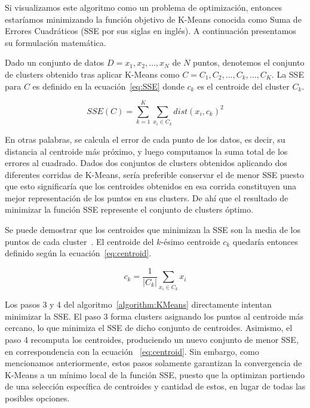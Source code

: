 Si visualizamos este algoritmo como un problema de optimización, entonces estaríamos minimizando la función objetivo de K-Means conocida como Suma de Errores Cuadráticos (SSE por sus siglas en inglés).
A continuación presentamos su formulación matemática.

Dado un conjunto de datos $D={x_1,x_2,\dots,x_N}$ de $N$ puntos, denotemos el conjunto de clusters obtenido tras aplicar K-Means como $C={C_1,C_2,\dots,C_k,\dots,C_K}$.
La SSE para $C$ es definido en la ecuación~\ref{eq:SSE} donde $c_k$ es el centroide del cluster $C_k$.

\begin{equation}
    \label{eq:SSE}
    SSE(C)=\sum_{k=1}^{K}{\sum_{x_{i}\in C_k}{dist(x_i, c_k)^2}}
\end{equation}

En otras palabras, se calcula el error de cada punto de los datos, es decir, su distancia al centroide más próximo, y luego computamos la suma total de los errores al cuadrado.
Dados dos conjuntos de clusters obtenidos aplicando dos diferentes corridas de K-Means, sería preferible conservar el de menor SSE puesto que esto significaría que los centroides obtenidos en esa corrida constituyen una mejor representación de los puntos en sus clusters.
De ahí que el resultado de minimizar la función SSE represente el conjunto de clusters óptimo.

Se puede demostrar que los centroides que minimizan la SSE son la media de los puntos de cada cluster~\cite{Tan05}.
El centroide del $k$-ésimo centroide $c_k$ quedaría entonces definido según la ecuación~\ref{eq:centroid}.

\begin{equation}
    \label{eq:centroid}
    c_{k}=\frac{1}{|C_k|}\sum_{x_{i}\in C_k}{x_i}
\end{equation}

Los pasos 3 y 4 del algoritmo~\ref{algorithm:KMeans} directamente intentan minimizar la SSE. El paso 3 forma clusters asignando los puntos al centroide más cercano, lo que minimiza el SSE de dicho conjunto de centroides.
Asimismo, el paso 4 recomputa los centroides, produciendo un nuevo conjunto de menor SSE, en correspondencia con la ecuación ~\ref{eq:centroid}.
Sin embargo, como mencionamos anteriormente, estos pasos solamente garantizan la convergencia de K-Means a un mínimo local de la función SSE, puesto que la optimizan partiendo de una selección específica de centroides y cantidad de estos, en lugar de todas las posibles opciones.

